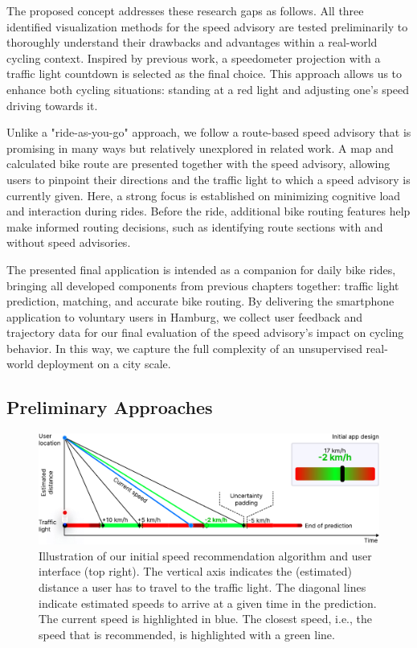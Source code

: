 The proposed concept addresses these research gaps as follows. All three identified visualization methods for the speed advisory are tested preliminarily to thoroughly understand their drawbacks and advantages within a real-world cycling context. Inspired by previous work, a speedometer projection with a traffic light countdown is selected as the final choice. This approach allows us to enhance both cycling situations: standing at a red light and adjusting one's speed driving towards it.

Unlike a "ride-as-you-go" approach, we follow a route-based speed advisory that is promising in many ways but relatively unexplored in related work. A map and calculated bike route are presented together with the speed advisory, allowing users to pinpoint their directions and the traffic light to which a speed advisory is currently given. Here, a strong focus is established on minimizing cognitive load and interaction during rides. Before the ride, additional bike routing features help make informed routing decisions, such as identifying route sections with and without speed advisories. 

The presented final application is intended as a companion for daily bike rides, bringing all developed components from previous chapters together: traffic light prediction, matching, and accurate bike routing. By delivering the smartphone application to voluntary users in Hamburg, we collect user feedback and trajectory data for our final evaluation of the speed advisory's impact on cycling behavior. In this way, we capture the full complexity of an unsupervised real-world deployment on a city scale.

\subsection{Preliminary Approaches}

\begin{figure}[t]
\centering
\includegraphics[width=\linewidth]{images/graph-based-speed-recommendation.pdf}
\caption{Illustration of our initial speed recommendation algorithm and user interface (top right). The vertical axis indicates the (estimated) distance a user has to travel to the traffic light. The diagonal lines indicate estimated speeds to arrive at a given time in the prediction. The current speed is highlighted in blue. The closest speed, i.e., the speed that is recommended, is highlighted with a green line.}
\label{fig:graph-based-speed-recommendation}
\end{figure}

